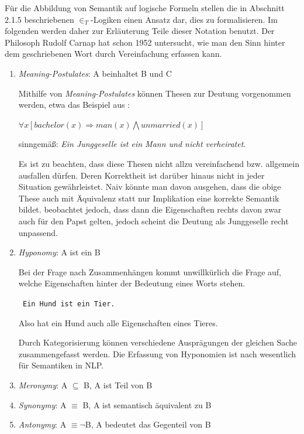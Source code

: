 \documentclass[12pt]{report}
\begin{document}
Für die Abbildung von Semantik auf logische Formeln stellen die in Abschnitt 2.1.5 beschriebenen $\in_T$-Logiken einen Ansatz dar, dies zu formalisieren. Im folgenden werden daher zur Erläuterung Teile dieser Notation benutzt. Der Philosoph Rudolf Carnap hat schon 1952  untersucht, wie man den Sinn hinter dem geschriebenen Wort durch Vereinfachung erfassen kann. 
\begin{enumerate}
\item \textit{Meaning-Postulates}: A beinhaltet B und C

Mithilfe von \textit{Meaning-Postulates} können Thesen zur Deutung vorgenommen werden, etwa das Beispiel aus \cite{car52}:

$\forall x[bachelor(x)\Rightarrow man(x)\bigwedge unmarried(x)]$

sinngemäß: \textit{Ein Junggeselle ist ein Mann und nicht verheiratet}.

Es ist zu beachten, dass diese Thesen nicht allzu vereinfachend bzw. allgemein ausfallen dürfen. Deren Korrektheit ist darüber hinaus nicht in jeder Situation gewährleistet. Naiv könnte man davon ausgehen, dass die obige These auch mit Äquivalenz statt nur Implikation eine korrekte Semantik bildet. \cite{car52} beobachtet jedoch, dass dann die Eigenschaften rechts davon zwar auch für den Papst gelten, jedoch scheint die Deutung als Junggeselle recht unpassend.

\item \textit{Hyponomy}: A ist ein B

Bei der Frage nach Zusammenhängen kommt unwillkürlich die Frage auf, welche Eigenschaften hinter der Bedeutung eines Worts stehen. 

\tt
Ein Hund ist ein Tier. 
\rm

Also hat ein Hund auch alle Eigenschaften eines Tieres.

Durch Kategorisierung können verschiedene Ausprägungen  der gleichen Sache zusammengefasst werden. Die Erfassung von Hyponomien ist nach \cite{cop04} wesentlich für Semantiken in NLP.

\item \textit{Meronymy}: A $\subseteq$ B, A ist Teil von B

\item \textit{Synonymy}: A $\equiv$ B, A ist semantisch äquivalent zu B

\item \textit{Antonymy}: A $\equiv \neg$B, A bedeutet das Gegenteil von B

\end{enumerate}
\end{document}
